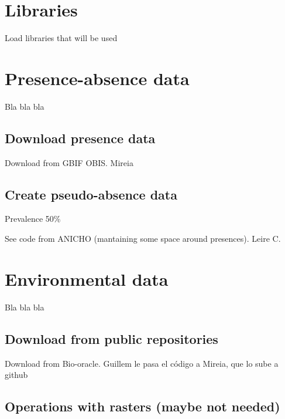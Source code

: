 \documentclass[
]{book}
\begin{document}
\hypertarget{libraries}{%
\chapter{Libraries}\label{libraries}}

Load libraries that will be used

\hypertarget{presence-absence-data}{%
\chapter{Presence-absence data}\label{presence-absence-data}}

Bla bla bla

\hypertarget{download-presence-data}{%
\section{Download presence data}\label{download-presence-data}}

Download from GBIF OBIS. Mireia

\hypertarget{create-pseudo-absence-data}{%
\section{Create pseudo-absence data}\label{create-pseudo-absence-data}}

Prevalence 50\%

See code from ANICHO (mantaining some space around presences). Leire C.

\hypertarget{environmental-data}{%
\chapter{Environmental data}\label{environmental-data}}

Bla bla bla

\hypertarget{download-from-public-repositories}{%
\section{Download from public repositories}\label{download-from-public-repositories}}

Download from Bio-oracle.
Guillem le pasa el código a Mireia, que lo sube a github

\hypertarget{operations-with-rasters-maybe-not-needed}{%
\section{Operations with rasters (maybe not needed)}\label{operations-with-rasters-maybe-not-needed}}
\end{document}
